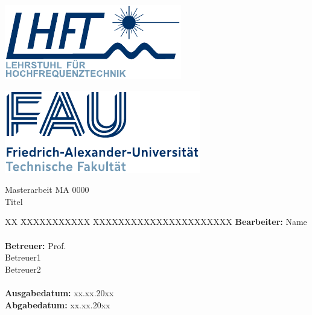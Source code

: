 \thispagestyle{empty}
\setcounter{page}{-1}
\enlargethispage{2cm}	
\begin{minipage}[t]{.5\textwidth}
	\vspace{0pt}
	\raggedright
	\includegraphics*[height = 2.2 cm]{bilder/LHFT_Logo}
\end{minipage}
%
\hfill
%
\begin{minipage}[t]{.5\textwidth}
	\vspace{0pt}
	\raggedleft
	\includegraphics*[height = 2.4 cm]{bilder/FAU_Logo}
\end{minipage}
%
\vfill


{\centering
\large{Masterarbeit MA 0000} \\
\Large{Titel}
\par}


\vfill
\vspace{.5cm}


{\raggedright
\begin{tabbing}
XX \= XXXXXXXXXXX \= XXXXXXXXXXXXXXXXXXXXXX \kill
		\> \textbf{Bearbeiter:} 	\> Name 						\\
 		\>							\>									\\
		\> \textbf{Betreuer:}		\> Prof. 	\\
		\>							\> Betreuer1			\\
		\>							\> Betreuer2			\\
		\>							\> 									\\
		\> \textbf{Ausgabedatum:}	\> xx.xx.20xx	\\
		\> \textbf{Abgabedatum:}	\> xx.xx.20xx			
\end{tabbing}
\par}

\newpage
\thispagestyle{empty}

\cleardoublepage
